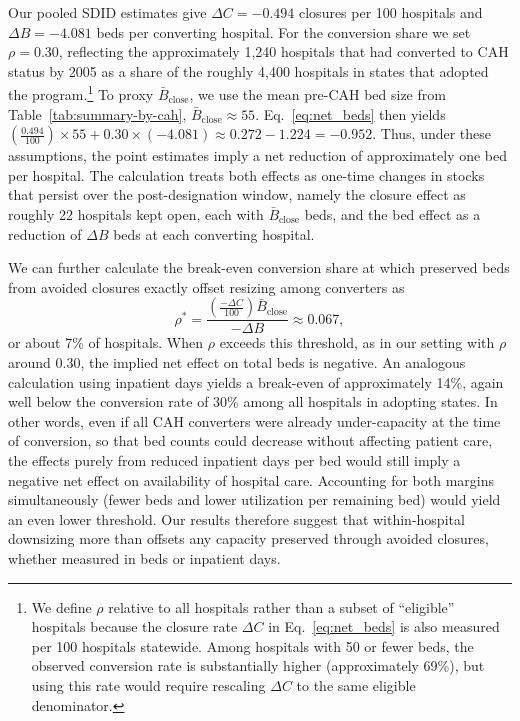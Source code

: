 \documentclass[a4paper, 12pt, twoside]{article}
\begin{document}
Our pooled SDID estimates give $\Delta C=-0.494$ closures per 100 hospitals and $\Delta B=-4.081$ beds per converting hospital. For the conversion share we set $\rho=0.30$, reflecting the approximately 1,240 hospitals that had converted to CAH status by 2005 as a share of the roughly 4,400 hospitals in states that adopted the program.\footnote{We define $\rho$ relative to all hospitals rather than a subset of ``eligible'' hospitals because the closure rate $\Delta C$ in Eq.~\eqref{eq:net_beds} is also measured per 100 hospitals statewide. Among hospitals with 50 or fewer beds, the observed conversion rate is substantially higher (approximately 69\%), but using this rate would require rescaling $\Delta C$ to the same eligible denominator.} To proxy $\bar B_{\text{close}}$, we use the mean pre-CAH bed size from Table~\ref{tab:summary-by-cah}, $\bar B_{\text{close}}\approx 55$. Eq.~\eqref{eq:net_beds} then yields $\left(\frac{0.494}{100}\right)\times 55 + 0.30\times(-4.081) \approx 0.272 - 1.224 = -0.952$. Thus, under these assumptions, the point estimates imply a net reduction of approximately one bed per hospital. The calculation treats both effects as one-time changes in stocks that persist over the post-designation window, namely the closure effect as roughly 22 hospitals kept open, each with $\bar B_{\text{close}}$ beds, and the bed effect as a reduction of $\Delta B$ beds at each converting hospital.

We can further calculate the break-even conversion share at which preserved beds from avoided closures exactly offset resizing among converters as
\begin{equation}
\rho^{*}= \frac{\left(\frac{-\Delta C}{100}\right)\bar B_{\text{close}}}{-\Delta B} \approx 0.067,
\label{eq:rho_star_beds}
\end{equation}
or about 7\% of hospitals. When $\rho$ exceeds this threshold, as in our setting with $\rho$ around 0.30, the implied net effect on total beds is negative. An analogous calculation using inpatient days yields a break-even of approximately 14\%, again well below the conversion rate of 30\% among all hospitals in adopting states. In other words, even if all CAH converters were already under-capacity at the time of conversion, so that bed counts could decrease without affecting patient care, the effects purely from reduced inpatient days per bed would still imply a negative net effect on availability of hospital care. Accounting for both margins simultaneously (fewer beds and lower utilization per remaining bed) would yield an even lower threshold. Our results therefore suggest that within-hospital downsizing more than offsets any capacity preserved through avoided closures, whether measured in beds or inpatient days.
\end{document}
